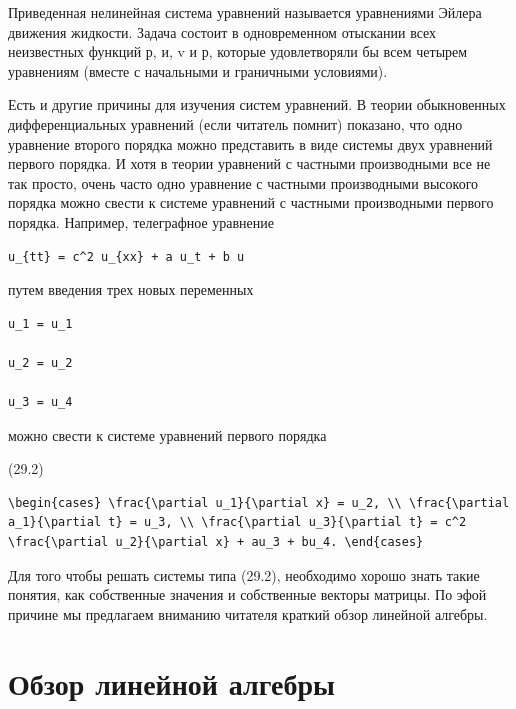 \documentclass[
  ukrainian,
]{article}
\begin{document}
Приведенная нелинейная система уравнений называется уравнениями Эйлера
движения жидкости. Задача состоит в одновременном отыскании всех
неизвестных функций р, и, v и р, которые удовлетворяли бы всем четырем
уравнениям (вместе с начальными и граничными условиями).

Есть и другие причины для изучения систем уравнений. В теории
обыкновенных дифференциальных уравнений (если читатель помнит) показано,
что одно уравнение второго порядка можно представить в виде системы двух
уравнений первого порядка. И хотя в теории уравнений с частными
производными все не так просто, очень часто одно уравнение с частными
производными высокого порядка можно свести к системе уравнений с
частными производными первого порядка. Например, телеграфное уравнение

\begin{verbatim}
u_{tt} = c^2 u_{xx} + a u_t + b u
\end{verbatim}

путем введения трех новых переменных

\begin{verbatim}
u_1 = u_1

u_2 = u_2

u_3 = u_4
\end{verbatim}

можно свести к системе уравнений первого порядка

(29.2)

\begin{verbatim}
\begin{cases} \frac{\partial u_1}{\partial x} = u_2, \\ \frac{\partial a_1}{\partial t} = u_3, \\ \frac{\partial u_3}{\partial t} = c^2 \frac{\partial u_2}{\partial x} + au_3 + bu_4. \end{cases}
\end{verbatim}

Для того чтобы решать системы типа (29.2), необходимо хорошо знать такие
понятия, как собственные значения и собственные векторы матрицы. По эфой
причине мы предлагаем вниманию читателя краткий обзор линейной алгебры.

\section{Обзор линейной
алгебры}\label{ux43eux431ux437ux43eux440-ux43bux438ux43dux435ux439ux43dux43eux439-ux430ux43bux433ux435ux431ux440ux44b}
\end{document}
